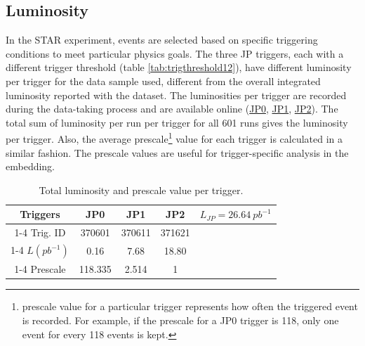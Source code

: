 \subsection{Luminosity}
 \label{subsec:lumi}
 In the STAR experiment, events are selected based on specific triggering conditions to meet particular physics goals. The three JP triggers, each with a different trigger threshold (table \ref{tab:trigthreshold12}), have different luminosity per trigger for the data sample used, different from the overall integrated luminosity reported with the dataset. The luminosities per trigger are recorded during the data-taking process and are available online (\href{https://www.star.bnl.gov/protected/common/common2012/trigger2012/lumipp200GeV/lum_perrun_JP0.txt}{JP0}, \href{https://www.star.bnl.gov/protected/common/common2012/trigger2012/lumipp200GeV/lum_perrun_JP1.txt}{JP1}, \href{https://www.star.bnl.gov/protected/common/common2012/trigger2012/lumipp200GeV/lum_perrun_JP2.txt}{JP2}). The total sum of luminosity per run per trigger for all 601 runs gives the luminosity per trigger. Also, the average prescale\footnote{prescale value for a particular trigger represents how often the triggered event is recorded. For example, if the prescale for a JP0 trigger is 118, only one event for every 118 events is kept.} value for each trigger is calculated in a similar fashion. The prescale values are useful for trigger-specific analysis in the embedding. 
 
 \begin{table}
 	\centering
 	\begin{tabular}{|c|c|c|c|c|}
		\hline
		Triggers & JP0 & JP1 & JP2&\multirow{4}{*}{$L_{JP}= 26.64\  pb^{-1}$} \\
		\cline{1-4}
		 Trig. ID & 370601 & 370611 & 371621&\\
		 \cline{1-4}
		 $L(pb^{-1})$ & 0.16 & 7.68 & 18.80 & \\
		 \cline{1-4}		
		 Prescale & 118.335 & 2.514 & 1&\\
		 \hline
 	\end{tabular}
 \caption{Total luminosity and prescale value per trigger.}
 \label{tab:lumi}
 \end{table}
  

